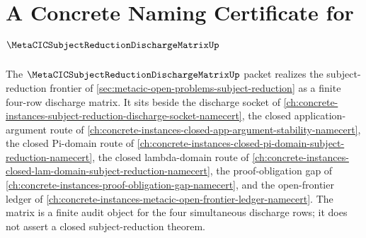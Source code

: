 \chapter{A Concrete Naming Certificate for $\MetaCICSubjectReductionDischargeMatrixUp$}
\label{ch:concrete-instances-metacic-subject-reduction-discharge-matrix-namecert}

The $\MetaCICSubjectReductionDischargeMatrixUp$ packet realizes the subject-reduction frontier of \autoref{sec:metacic-open-problems-subject-reduction} as a finite four-row discharge matrix. It sits beside the discharge socket of \autoref{ch:concrete-instances-subject-reduction-discharge-socket-namecert}, the closed application-argument route of \autoref{ch:concrete-instances-closed-app-argument-stability-namecert}, the closed Pi-domain route of \autoref{ch:concrete-instances-closed-pi-domain-subject-reduction-namecert}, the closed lambda-domain route of \autoref{ch:concrete-instances-closed-lam-domain-subject-reduction-namecert}, the proof-obligation gap of \autoref{ch:concrete-instances-proof-obligation-gap-namecert}, and the open-frontier ledger of \autoref{ch:concrete-instances-metacic-open-frontier-ledger-namecert}. The matrix is a finite audit object for the four simultaneous discharge rows; it does not assert a closed subject-reduction theorem.



